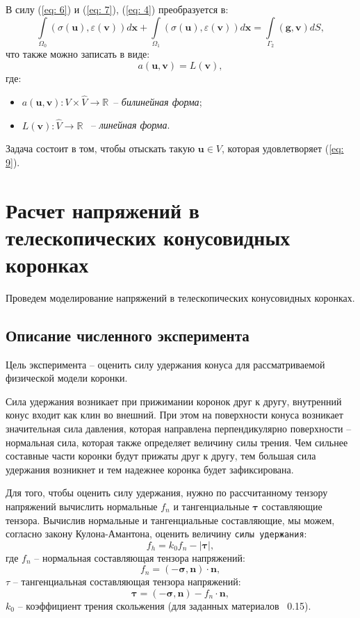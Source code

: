 \documentclass[a4paper, 14pt]{extreport}
\begin{document}
В силу (\ref{eq: 6}) и (\ref{eq: 7}), (\ref{eq: 4}) преобразуется в:
\begin{equation}
	\label{eq: 8}
	\int\limits_{\Omega_0}{(\sigma(\textbf{u}), \varepsilon(\textbf{v}))}d\textbf{x} + 
	\int\limits_{\Omega_1}{(\sigma(\textbf{u}), \varepsilon(\textbf{v}))}d\textbf{x} = 
		\int\limits_{\Gamma_2}{(\textbf{g}, \textbf{v})}dS,
\end{equation}
что также можно записать в виде:
\begin{equation}
	\label{eq: 9}
	a(\textbf{u}, \textbf{v}) = L(\textbf{v}),
\end{equation}
где:
\begin{itemize}
	\item $a(\textbf{u}, \textbf{v}) : V \times \hat{V} \rightarrow \mathbb{R}$ \,-- \textit{билинейная форма};
	\item $L(\textbf{v}) : \hat{V} \rightarrow \mathbb{R}$ \, -- \textit{линейная форма}.
\end{itemize}

Задача состоит в том, чтобы отыскать такую  $\textbf{u} \in V$, 
которая удовлетворяет (\ref{eq: 9}).


\chapter{Расчет напряжений в телескопических конусовидных коронках}
\label{ch:exp}

Проведем моделирование напряжений в телескопических
конусовидных коронках.


\section{Описание численного эксперимента}

Цель эксперимента -- оценить силу удержания конуса для рассматриваемой физической модели коронки.

Сила удержания возникает при прижимании коронок друг
к другу, внутренний конус входит как клин во внешний.  
При этом на поверхности конуса возникает значительная сила 
давления, которая направлена перпендикулярно поверхности -- 
нормальная сила, которая также определяет величину силы 
трения. Чем сильнее составные части коронки будут прижаты 
друг к другу, тем большая сила удержания возникнет и тем 
надежнее коронка будет зафиксирована.

Для того, чтобы оценить силу удержания, нужно по 
рассчитанному тензору напряжений
вычислить нормальные $f_n$ и тангенциальные 
$\boldsymbol{\tau}$ составляющие тензора. 
Вычислив нормальные и тангенциальные составляющие, мы 
можем, согласно закону Кулона-Амантона, оценить величину 
\texttt{силы удержания}:
\begin{equation}
	\label{eq: ka}
	f_{h} = k_0 f_n -|\boldsymbol{\tau}|,
\end{equation}
где $f_n$ -- нормальная составляющая тензора напряжений:
$$f_n = (-\boldsymbol{\sigma}, \boldsymbol{n}) \cdot \boldsymbol{n},$$
$\tau$ -- тангенциальная составляющая тензора напряжений:
$$\boldsymbol{\tau} = (-\boldsymbol{\sigma}, \boldsymbol{n}) - f_n \cdot \boldsymbol{n},$$
$k_0$ -- коэффициент трения скольжения (для заданных материалов ~0.15).
\end{document}
